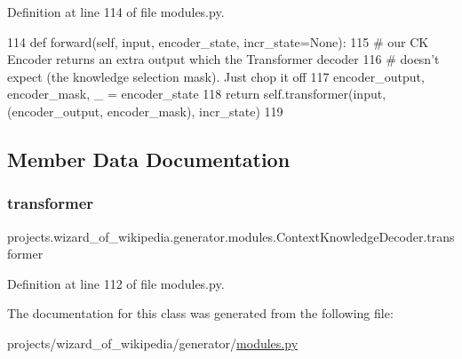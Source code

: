 Definition at line 114 of file modules.\+py.


\begin{DoxyCode}
114     \textcolor{keyword}{def }forward(self, input, encoder\_state, incr\_state=None):
115         \textcolor{comment}{# our CK Encoder returns an extra output which the Transformer decoder}
116         \textcolor{comment}{# doesn't expect (the knowledge selection mask). Just chop it off}
117         encoder\_output, encoder\_mask, \_ = encoder\_state
118         \textcolor{keywordflow}{return} self.transformer(input, (encoder\_output, encoder\_mask), incr\_state)
119 \end{DoxyCode}


\subsection{Member Data Documentation}
\mbox{\label{classprojects_1_1wizard__of__wikipedia_1_1generator_1_1modules_1_1ContextKnowledgeDecoder_a83385b523ae134dcf14e6bc0a9a82b8c}} 
\subsubsection{\texorpdfstring{transformer}{transformer}}
{\footnotesize\ttfamily projects.\+wizard\+\_\+of\+\_\+wikipedia.\+generator.\+modules.\+Context\+Knowledge\+Decoder.\+transformer}



Definition at line 112 of file modules.\+py.



The documentation for this class was generated from the following file\+:\begin{DoxyCompactItemize}
\item 
projects/wizard\+\_\+of\+\_\+wikipedia/generator/\hyperlink{projects_2wizard__of__wikipedia_2generator_2modules_8py}{modules.\+py}\end{DoxyCompactItemize}
